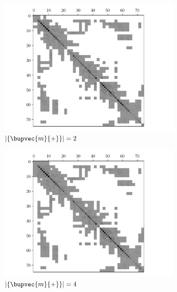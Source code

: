 \begin{figure}
  \centering
  \begin{subfigure}{0.49\textwidth}
    \includegraphics[width=\textwidth]{figs/seif-2-info-matrix.pdf} 
    \caption{$\lvert\{ \bupvec{m}{+} \}\rvert = 2$}
    \label{fig:seif-info-matrix-02}
  \end{subfigure}
  \hfill
  \begin{subfigure}{0.49\textwidth}
    \includegraphics[width=\textwidth]{figs/seif-4-info-matrix.pdf} 
    \caption{$\lvert\{ \bupvec{m}{+} \}\rvert = 4$}
    \label{fig:seif-info-matrix-04}
  \end{subfigure}
  \begin{subfigure}{0.49\textwidth}

\end{subfigure}
\end{figure}
